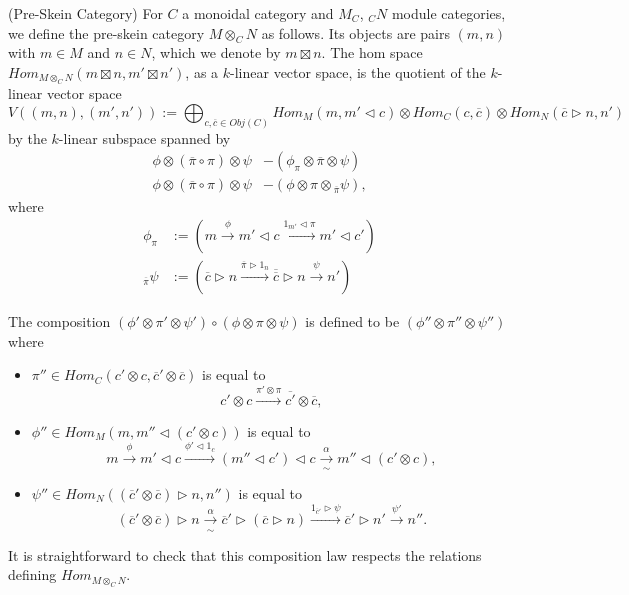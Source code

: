 \begin{definition}\label{pre-skein} (Pre-Skein Category)
  For $C$ a monoidal category and $M_C$, $_{C}N$ module categories, we define
  the pre-skein category $M\otimes_C N$ as follows. Its objects are pairs $(m,n)$ with
  $m\in M$ and $n\in N$, which we denote by $m\boxtimes n$. The hom space
  $Hom_{M\otimes_C N}(m\boxtimes n, m'\boxtimes n')$, as a $k$-linear vector space, is the quotient
  of the $k$-linear vector space $$V((m,n),(m',n')):=\bigoplus_{c,\overline{c} \in Obj(C)} Hom_{M}(m, m' \lhd c) \otimes Hom_{C}(c,\overline{c}) \otimes Hom_{N} (\overline{c} \rhd n, n')$$
  by the $k$-linear subspace spanned by
  \begin{align}
    \phi \otimes (\overline{\pi} \circ \pi) \otimes \psi &- (\phi_{\pi} \otimes \overline{\pi} \otimes \psi) \label{relation/a} \\
    \phi \otimes (\overline{\pi} \circ \pi) \otimes \psi &- (\phi \otimes \pi \otimes {}_{\overline{\pi}}\psi) \label{relation/b},
  \end{align}
  where
  \begin{align}
    \phi_{\pi}  &:= \left( m \xrightarrow{\phi} m' \lhd c \xrightarrow{1_{m'} \lhd \pi} m' \lhd c' \right) \\
    {}_{\overline{\pi}}\psi &:= \left( \overline{c} \rhd n \xrightarrow{\overline{\pi} \rhd 1_{n}} \overline{\overline{c}} \rhd n \xrightarrow{\psi} n' \right)
  \end{align}
  
    \begin{center}
    
  \end{center}
  
  \noindent The composition $(\phi' \otimes \pi' \otimes \psi' ) \circ (\phi \otimes \pi \otimes \psi)$ is defined to be $(\phi'' \otimes \pi'' \otimes \psi'')$ where
  \begin{itemize}
    \item
    $\pi'' \in Hom_{C}(c' \otimes c, \overline{c}' \otimes \overline{c})$ is equal to
    \[
      c' \otimes c \xrightarrow{\pi' \otimes \pi} \overline{c'} \otimes \overline{c},
    \]
    \item
    \noindent $\phi'' \in Hom_{M}(m, m'' \lhd (c' \otimes c))$ is equal to
    \[
      m \xrightarrow{\phi} m' \lhd c \xrightarrow{\phi' \lhd 1_{c}} (m'' \lhd c') \lhd c \xrightarrow[\sim]{\alpha} m'' \lhd (c' \otimes c),
    \]
    \item
    \noindent $\psi'' \in Hom_{N}((\overline{c}' \otimes \overline{c}) \rhd n, n'')$ is equal to
    \[
      (\overline{c}' \otimes \overline{c}) \rhd n \xrightarrow[\sim]{\alpha} \overline{c}' \rhd (\overline{c} \rhd n) \xrightarrow{1_{\overline{c}'} \rhd \psi} \overline{c}' \rhd n' \xrightarrow{\psi'} n''.
    \]
  \end{itemize}
  
    \begin{center}
    
  \end{center}
  It is straightforward to check that this composition law respects the relations defining $Hom_{M\otimes_C N}$.
\end{definition}

